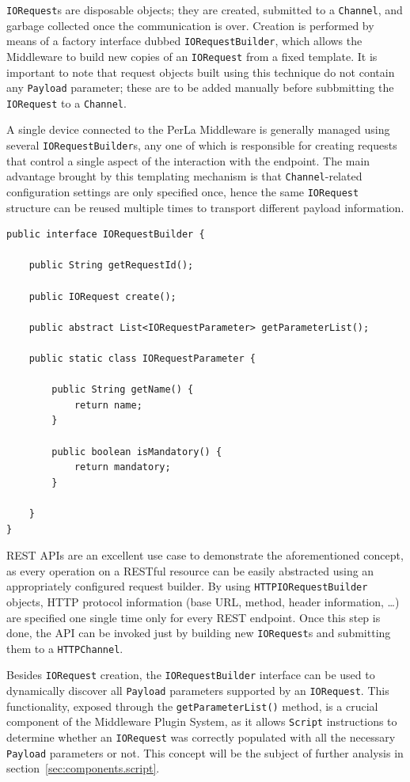 \texttt{IORequest}s are disposable objects; they are created, submitted to a \texttt{Channel}, and garbage collected once the communication is over. Creation is performed by means of a factory interface dubbed \texttt{IORequestBuilder}, which allows the Middleware to build new copies of an \texttt{IORequest} from a fixed template. It is important to note that request objects built using this technique do not contain any \texttt{Payload} parameter; these are to be added manually before subbmitting the \texttt{IORequest} to a \texttt{Channel}.

A single device connected to the PerLa Middleware is generally managed using several \texttt{IORequestBuilder}s, any one of which is responsible for creating requests that control a single aspect of the interaction with the endpoint. The main advantage brought by this templating mechanism is that \texttt{Channel}-related configuration settings are only specified once, hence the same \texttt{IORequest} structure can be reused multiple times to transport different payload information.

\lstset{language=Java}
\begin{lstlisting}[float,floatplacement=!hbt,caption=The IORequestBuilder interface,label={lst:iorequestbuilder}]
public interface IORequestBuilder {

	public String getRequestId();

	public IORequest create();

	public abstract List<IORequestParameter> getParameterList();

	public static class IORequestParameter {

		public String getName() {
			return name;
		}

		public boolean isMandatory() {
			return mandatory;
		}

	}
}
\end{lstlisting}

REST APIs are an excellent use case to demonstrate the aforementioned concept, as every operation on a RESTful resource can be easily abstracted using an appropriately configured request builder. By using \texttt{HTTPIORequestBuilder} objects, HTTP protocol information (base URL, method, header information, \ldots) are specified one single time only for every REST endpoint. Once this step is done, the API can be invoked just by building new \texttt{IORequest}s and submitting them to a \texttt{HTTPChannel}.

Besides \texttt{IORequest} creation, the \texttt{IORequestBuilder} interface can be used to dynamically discover all \texttt{Payload} parameters supported by an \texttt{IORequest}. This functionality, exposed through the \texttt{getParameterList()} method, is a crucial component of the Middleware Plugin System, as it allows \texttt{Script} instructions to determine whether an \texttt{IORequest} was correctly populated with all the necessary \texttt{Payload} parameters or not. This concept will be the subject of further analysis in section~\ref{sec:components.script}.

